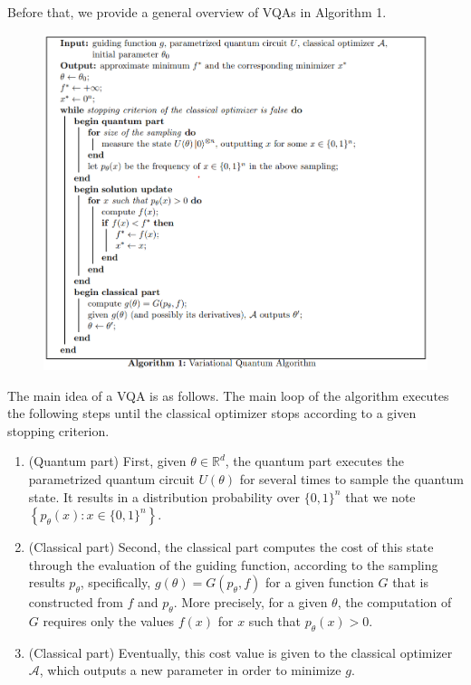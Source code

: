 Before that, we provide a general overview of VQAs in Algorithm 1. 
\begin{figure}
    \centering
    \includegraphics[width=1\linewidth]{Images/VQA-algorithm.png}
\end{figure}

The main idea of a VQA is as follows. The main loop of the algorithm executes the following steps until the classical optimizer stops according to a given stopping criterion. 

\begin{enumerate}
    \item (Quantum part) First, given $\theta \in \mathbb{R}^{d}$, the quantum part executes the parametrized quantum circuit $U(\theta)$ for several times to sample the quantum state. It results in a distribution probability over $\{0,1\}^{n}$ that we note $\left\{p_{\theta}(x): x \in\{0,1\}^{n}\right\}$. %
    \item (Classical part) Second, the classical part computes the cost of this state through the evaluation of the guiding function, according to the sampling results $p_{\theta}$, specifically, $g(\theta)=G\left(p_{\theta}, f\right)$ for a given function $G$ that is constructed from $f$ and $p_{\theta}$. More precisely, for a given $\theta$, the computation of $G$ requires only the values $f(x)$ for $x$ such that $p_{\theta}(x)>0$. %
    \item (Classical part) Eventually, this cost value is given to the classical optimizer $\mathcal{A}$, which outputs a new parameter in order to minimize $g$. %
\end{enumerate}

